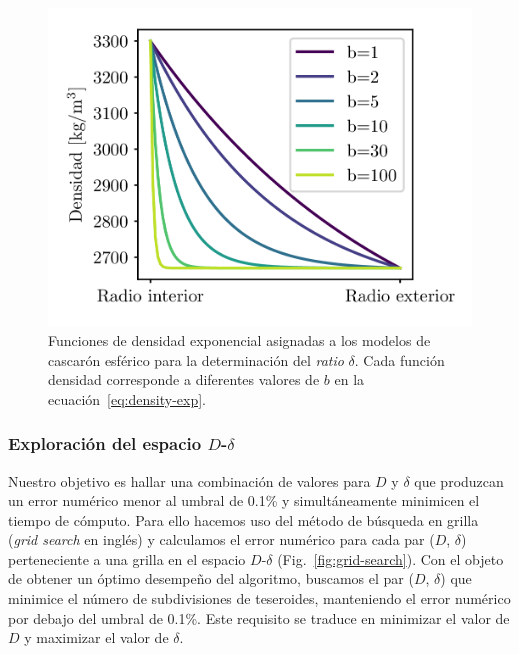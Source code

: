 \begin{figure}[!b]
\centering
\includegraphics[width=0.5\linewidth]{figs/tesseroids-variable-density/exponential-densities.png}
\caption{
    Funciones de densidad exponencial asignadas a los modelos de cascarón
    esférico para la determinación del \emph{ratio} $\delta$.
    Cada función densidad corresponde a diferentes valores de $b$ en la
    ecuación~\ref{eq:density-exp}.
}
\label{fig:exp-densities}
\end{figure}


\subsubsection{Exploración del espacio $D$-$\delta$}

Nuestro objetivo es hallar una combinación de valores para $D$ y $\delta$ que
produzcan un error numérico menor al umbral de 0.1\% y simultáneamente
minimicen el tiempo de cómputo.
Para ello hacemos uso del método de búsqueda en grilla (\emph{grid search} en
inglés) y calculamos el error numérico para cada par ($D$, $\delta$)
perteneciente a una grilla en el espacio $D$-$\delta$
(Fig.~\ref{fig:grid-search}).
Con el objeto de obtener un óptimo desempeño del algoritmo, buscamos el par
($D$, $\delta$) que minimice el número de subdivisiones de teseroides,
manteniendo el error numérico por debajo del umbral de 0.1\%.
Este requisito se traduce en minimizar el valor de $D$ y maximizar el valor de
$\delta$.

